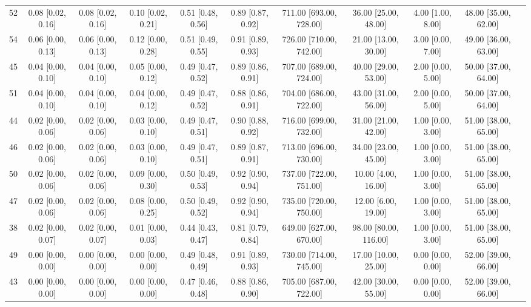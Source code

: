 \documentclass[8pt]{article}
\begin{document}
\begin{center}
\begin{footnotesize}
\begin{longtable}{|ccccccccccc|}
 52 &  0.08 [0.02, 0.16] &  0.08 [0.02, 0.16] &  0.10 [0.02, 0.21] &  0.51 [0.48, 0.56] &  0.89 [0.87, 0.92] &  711.00 [693.00, 728.00] &     36.00 [25.00, 48.00] &     4.00 [1.00, 8.00] &  48.00 [35.00, 62.00] \\
 54 &  0.06 [0.00, 0.13] &  0.06 [0.00, 0.13] &  0.12 [0.00, 0.28] &  0.51 [0.49, 0.55] &  0.91 [0.89, 0.93] &  726.00 [710.00, 742.00] &     21.00 [13.00, 30.00] &     3.00 [0.00, 7.00] &  49.00 [36.00, 63.00] \\
 45 &  0.04 [0.00, 0.10] &  0.04 [0.00, 0.10] &  0.05 [0.00, 0.12] &  0.49 [0.47, 0.52] &  0.89 [0.86, 0.91] &  707.00 [689.00, 724.00] &     40.00 [29.00, 53.00] &     2.00 [0.00, 5.00] &  50.00 [37.00, 64.00] \\
 51 &  0.04 [0.00, 0.10] &  0.04 [0.00, 0.10] &  0.04 [0.00, 0.12] &  0.49 [0.47, 0.52] &  0.88 [0.86, 0.91] &  704.00 [686.00, 722.00] &     43.00 [31.00, 56.00] &     2.00 [0.00, 5.00] &  50.00 [37.00, 64.00] \\
 44 &  0.02 [0.00, 0.06] &  0.02 [0.00, 0.06] &  0.03 [0.00, 0.10] &  0.49 [0.47, 0.51] &  0.90 [0.88, 0.92] &  716.00 [699.00, 732.00] &     31.00 [21.00, 42.00] &     1.00 [0.00, 3.00] &  51.00 [38.00, 65.00] \\
 46 &  0.02 [0.00, 0.06] &  0.02 [0.00, 0.06] &  0.03 [0.00, 0.10] &  0.49 [0.47, 0.51] &  0.89 [0.87, 0.91] &  713.00 [696.00, 730.00] &     34.00 [23.00, 45.00] &     1.00 [0.00, 3.00] &  51.00 [38.00, 65.00] \\
 50 &  0.02 [0.00, 0.06] &  0.02 [0.00, 0.06] &  0.09 [0.00, 0.30] &  0.50 [0.49, 0.53] &  0.92 [0.90, 0.94] &  737.00 [722.00, 751.00] &      10.00 [4.00, 16.00] &     1.00 [0.00, 3.00] &  51.00 [38.00, 65.00] \\
 47 &  0.02 [0.00, 0.06] &  0.02 [0.00, 0.06] &  0.08 [0.00, 0.25] &  0.50 [0.49, 0.52] &  0.92 [0.90, 0.94] &  735.00 [720.00, 750.00] &      12.00 [6.00, 19.00] &     1.00 [0.00, 3.00] &  51.00 [38.00, 65.00] \\
 38 &  0.02 [0.00, 0.07] &  0.02 [0.00, 0.07] &  0.01 [0.00, 0.03] &  0.44 [0.43, 0.47] &  0.81 [0.79, 0.84] &  649.00 [627.00, 670.00] &    98.00 [80.00, 116.00] &     1.00 [0.00, 3.00] &  51.00 [38.00, 65.00] \\
 49 &  0.00 [0.00, 0.00] &  0.00 [0.00, 0.00] &  0.00 [0.00, 0.00] &  0.49 [0.48, 0.49] &  0.91 [0.89, 0.93] &  730.00 [714.00, 745.00] &     17.00 [10.00, 25.00] &     0.00 [0.00, 0.00] &  52.00 [39.00, 66.00] \\
 43 &  0.00 [0.00, 0.00] &  0.00 [0.00, 0.00] &  0.00 [0.00, 0.00] &  0.47 [0.46, 0.48] &  0.88 [0.86, 0.90] &  705.00 [687.00, 722.00] &     42.00 [30.00, 55.00] &     0.00 [0.00, 0.00] &  52.00 [39.00, 66.00] \\

\end{longtable}
\end{footnotesize}
\end{center}
\end{document}
